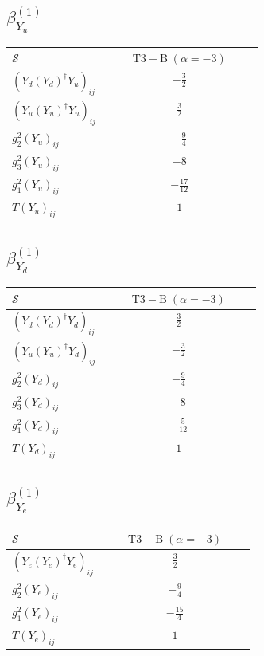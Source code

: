 \documentclass[9pt]{article}
\begin{document}
\subsection*{$ \beta_{Y_u}^{(1)} $}
\begin{longtable}{@{}p{0.38\linewidth}c@{}}
\toprule
$\mathcal{S}$ & $ \mathrm{T3-B}\;(\alpha=-3) $ \\
\midrule
$ (Y_d (Y_d)^{\dagger} Y_u)_{ij} $ & $ - \frac{3}{2} $ \\
$ (Y_u (Y_u)^{\dagger} Y_u)_{ij} $ & $ \frac{3}{2} $ \\
$ g_2^2 (Y_u)_{ij} $ & $ - \frac{9}{4} $ \\
$ g_3^2 (Y_u)_{ij} $ & $ -8 $ \\
$ g_1^2 (Y_u)_{ij} $ & $ - \frac{17}{12} $ \\
$ T (Y_u)_{ij} $ & $ 1 $ \\
\bottomrule
\end{longtable}
\subsection*{$ \beta_{Y_d}^{(1)} $}
\begin{longtable}{@{}p{0.38\linewidth}c@{}}
\toprule
$\mathcal{S}$ & $ \mathrm{T3-B}\;(\alpha=-3) $ \\
\midrule
$ (Y_d (Y_d)^{\dagger} Y_d)_{ij} $ & $ \frac{3}{2} $ \\
$ (Y_u (Y_u)^{\dagger} Y_d)_{ij} $ & $ - \frac{3}{2} $ \\
$ g_2^2 (Y_d)_{ij} $ & $ - \frac{9}{4} $ \\
$ g_3^2 (Y_d)_{ij} $ & $ -8 $ \\
$ g_1^2 (Y_d)_{ij} $ & $ - \frac{5}{12} $ \\
$ T (Y_d)_{ij} $ & $ 1 $ \\
\bottomrule
\end{longtable}
\subsection*{$ \beta_{Y_e}^{(1)} $}
\begin{longtable}{@{}p{0.38\linewidth}c@{}}
\toprule
$\mathcal{S}$ & $ \mathrm{T3-B}\;(\alpha=-3) $ \\
\midrule
$ (Y_e (Y_e)^{\dagger} Y_e)_{ij} $ & $ \frac{3}{2} $ \\
$ g_2^2 (Y_e)_{ij} $ & $ - \frac{9}{4} $ \\
$ g_1^2 (Y_e)_{ij} $ & $ - \frac{15}{4} $ \\
$ T (Y_e)_{ij} $ & $ 1 $ \\
\bottomrule
\end{longtable}
\end{document}
